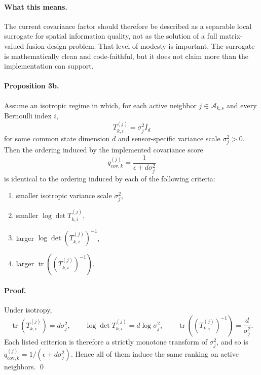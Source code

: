 \paragraph{What this means.}
The current covariance factor should therefore be described as a separable local surrogate for spatial information quality, not as the solution of a full matrix-valued fusion-design problem. That level of modesty is important. The surrogate is mathematically clean and code-faithful, but it does not claim more than the implementation can support.

\paragraph{Proposition 3b.}
Assume an isotropic regime in which, for each active neighbor $j \in \mathcal{A}_{k,s}$ and every Bernoulli index $i$,
\begin{equation}
T_{k,i}^{(j)} = \sigma_j^2 I_d
\end{equation}
for some common state dimension $d$ and sensor-specific variance scale $\sigma_j^2 > 0$. Then the ordering induced by the implemented covariance score
\begin{equation}
q_{\mathrm{cov},k}^{(j)} = \frac{1}{\epsilon + d \sigma_j^2}
\end{equation}
is identical to the ordering induced by each of the following criteria:
\begin{enumerate}
\item smaller isotropic variance scale $\sigma_j^2$,
\item smaller $\log \det T_{k,i}^{(j)}$,
\item larger $\log \det \left(T_{k,i}^{(j)}\right)^{-1}$,
\item larger $\operatorname{tr}\!\left(\left(T_{k,i}^{(j)}\right)^{-1}\right)$.
\end{enumerate}

\paragraph{Proof.}
Under isotropy,
\begin{equation}
\operatorname{tr}(T_{k,i}^{(j)}) = d\sigma_j^2,
\qquad
\log\det T_{k,i}^{(j)} = d\log \sigma_j^2,
\qquad
\operatorname{tr}\!\left(\left(T_{k,i}^{(j)}\right)^{-1}\right)=\frac{d}{\sigma_j^2}.
\end{equation}
Each listed criterion is therefore a strictly monotone transform of $\sigma_j^2$, and so is $q_{\mathrm{cov},k}^{(j)}=1/(\epsilon+d\sigma_j^2)$. Hence all of them induce the same ranking on active neighbors. \qed

